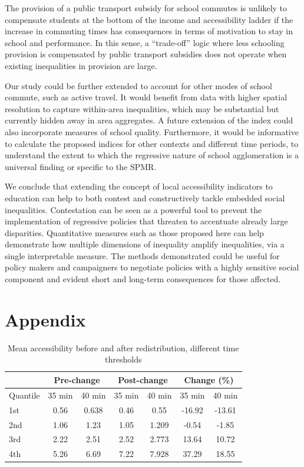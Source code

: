 \documentclass[3p,authoryear,preprint,review,12pt]{elsarticle}
\begin{document}
The provision of a public transport subsidy for school commutes is
unlikely to compensate students at the bottom of the income and
accessibility ladder if the increase in commuting times has consequences in terms of motivation to stay in school and performance. In this sense, a ``trade-off'' logic where less schooling provision is compensated by public transport subsidies does not operate when existing inequalities in provision are large.

Our study could be further extended to account for other modes of school commute, such as active travel. It would benefit from data with higher spatial resolution to capture within-area inequalities, which may be substantial but currently hidden away in area aggregates. A future extension of the index could also incorporate measures of school quality. Furthermore, it would be informative to calculate the proposed indices for other contexts and different time periods, to understand the extent to which the regressive nature of school agglomeration is a universal finding or specific to the SPMR.

We conclude that extending the concept of local accessibility indicators to education can help to both contest and constructively tackle embedded social inequalities. Contestation can be seen as a powerful tool to prevent the implementation of regressive policies that threaten to accentuate already large disparities. Quantitative measures such as those proposed here can help demonstrate how multiple dimensions of inequality amplify inequalities, via a single interpretable measure. The methods demonstrated could be useful for policy makers and campaigners to negotiate policies with a highly sensitive social component and evident short and long-term consequences for those affected.

\section*{Appendix}
\setcounter{figure}{0}
\renewcommand{\thefigure}{A\arabic{figure}}

\setcounter{table}{0}
\renewcommand{\thetable}{A\arabic{table}}

\begin{table}[H]\caption{Mean accessibility before and after
redistribution, different time thresholds}\label{sen1}
\begin{tabular}[c]{lcccccc}\hline
 & \multicolumn{2}{c}{Pre-change} & \multicolumn{2}{c}{Post-change} & \multicolumn{2}{c}{ Change (\%)} \\ \hline
Quantile & 35 min & 40 min & 35 min & 40 min& 35 min & 40 min \\ \hline 
1st & 0.56 & 0.638 & 0.46 & 0.55 & -16.92 & -13.61 \tabularnewline
2nd & 1.06 & 1.23 & 1.05 & 1.209 & -0.54 & -1.85 \tabularnewline
3rd & 2.22 & 2.51 & 2.52 & 2.773 & 13.64 & 10.72 \tabularnewline
4th& 5.26 & 6.69 & 7.22 & 7.928 & 37.29 & 18.55 \tabularnewline
\bottomrule
\end{tabular}
\end{table}
\end{document}
